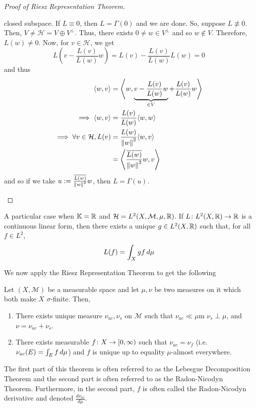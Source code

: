 \documentclass[11pt,leqno,oneside]{amsbook}
\numberwithin{thm}{section}
\newcommand{\M}{\mathcal{M}} %
\newcommand{\K}{\mathbb{K}} %
\newcommand{\s}{$\sigma$-} %
\renewcommand{\H}{\mathcal{H}} %
\begin{document}
\begin{proof}[Proof of Riesz Representation Theorem]
\begin{itemize}
    closed subspace. If \(L \equiv 0\), then \(L = \Gamma(0)\) and we are
    done. So, suppose \(L \not \equiv 0\). Then, \(V \neq \H = V
    \oplus V^\perp\). Thus, there exists \(0 \neq w \in V^\perp\) and
    so \(w \not \in V\). Therefore, \(L(w) \neq 0\). Now, for \(v \in
    \H\), we get \[
      L \left( v - \frac{L(v)}{L(w)} w \right) = L(v) -
      \frac{L(v)}{L(w)} L(w) = 0
    \]
    and thus
    \begin{align*}
      \langle w,v \rangle
      & = \left\langle w, \underbrace{v - \frac{L(v)}{L(w)} w}_{\in V}
        +\frac{L(v)}{L(w)} w \right\rangle \\
      \implies \langle w,v \rangle
      & = \frac{L(v)}{L(w)} \langle w,w \rangle \\
      \implies \forall v \in \H, L(v)
      & = \frac{L(w)}{\norm[w]^2} \langle w,v \rangle \\
      & = \left\langle \frac{\ov{L(w)}}{\norm[w]^2}w, v \right\rangle
    \end{align*}
    and so if we take \(u := \frac{\ov{L(w)}}{\norm[w]^2} w\), then
    \(L = \Gamma(u)\).
  \end{itemize}
\end{proof}
\begin{rmk}
  A particular case when \(\K = \R\) and \(\H = L^2(X,\M,\mu,\R)\). If
  \(L \from L^2(X,\R) \to \R\) is a continuous linear form, then there
  exists a unique \(g \in L^2(X,\R)\) such that, for all \(f \in
  L^2\), \[
    L(f) = \int_X gf \d \mu
  \]
\end{rmk}
We now apply the Riesz Representation Theorem to get the following
\begin{thm}
  Let \((X,\M)\) be a measurable space and let \(\mu,\nu\) be two
  measures on it which both make \(X\) \s finite. Then,
  \begin{enumerate}
  \item There exists unique measure \(\nu_{ac}, \nu_s\) on \(\M\) such
    that \(\nu_{ac} \ll \mu\)m \(\nu_s \perp \mu\), and \(\nu=
    \nu_{ac} + \nu_s\).
  \item There exists measurable \(f \from X \to [0,\infty)\) such that
    \(\nu_{ac} = \nu_f\) (i.e. \(\nu_{ac}(E) = \int_E f \d\mu\)) and
    \(f\) is unique up to equality \(\mu\)-almost everywhere.
  \end{enumerate}
\end{thm}
\begin{rmk}
  The first part of this theorem is often referred to as the Lebesgue
  Decomposition Theorem and the second part is often referred to as
  the Radon-Nicodyn Theorem. Furthermore, in the second part, \(f\) is
  often called the Radon-Nicodyn derivative and denoted \(\frac{d
    \nu_{ac}}{d\mu}\).
\end{rmk}
\end{document}
